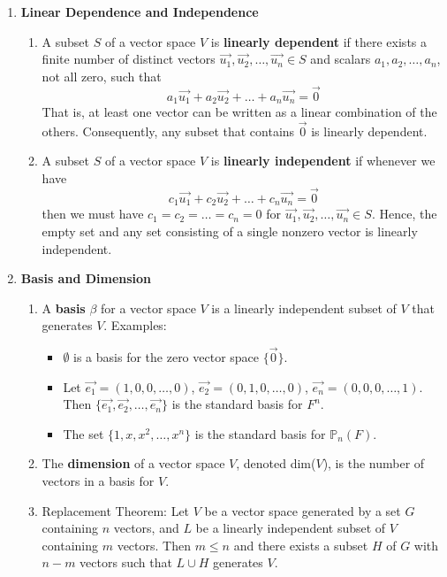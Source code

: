 \documentclass[10pt]{article}
\begin{document}
\begin{multicols*}{2}
\begin{enumerate}
    \item \textbf{Linear Dependence and Independence}
    \begin{enumerate}
        \item A subset $S$ of a vector space $V$ is \textbf{linearly dependent} if there exists a finite number of distinct vectors $\vec{u_1}, \vec{u_2}, \hdots, \vec{u_n} \in S$ and scalars $a_1, a_2, \hdots, a_n$, not all zero, such that
        $$a_1\vec{u_1} + a_2\vec{u_2} + \hdots + a_n\vec{u_n} = \vec{0}$$
        That is, at least one vector can be written as a linear combination of the others. Consequently, any subset that contains $\vec{0}$ is linearly dependent.
        \item A subset $S$ of a vector space $V$ is \textbf{linearly independent} if whenever we have
        $$c_1\vec{u_1} + c_2\vec{u_2} + \hdots + c_n\vec{u_n} = \vec{0}$$ 
        then we must have $c_1 = c_2 = \hdots = c_n = 0$ for $\vec{u_1}, \vec{u_2}, \hdots, \vec{u_n} \in S$. Hence, the empty set and any set consisting of a single nonzero vector is linearly independent.
    \end{enumerate}
    
    \item \textbf{Basis and Dimension}
    \begin{enumerate}
        \item A \textbf{basis} $\beta$ for a vector space $V$ is a linearly independent subset of $V$ that generates $V$. Examples:
        \begin{itemize}
            \item $\emptyset$ is a basis for the zero vector space $\{ \vec{0} \}$.
            \item Let $\vec{e_1} = (1,0,0,\hdots,0)$, $\vec{e_2} = (0,1,0,\hdots,0)$, $\vec{e_n} = (0,0,0,\hdots,1)$. Then $\{ \vec{e_1}, \vec{e_2}, \hdots, \vec{e_n} \}$ is the standard basis for $F^n$.
            \item The set $\{1,x,x^2,\hdots,x^n \}$ is the standard basis for $\mathbb{P}_n(F)$.
        \end{itemize}
        
        \item The \textbf{dimension} of a vector space $V$, denoted dim($V$), is the number of vectors in a basis for $V$.
        
        \item Replacement Theorem: Let $V$ be a vector space generated by a set $G$ containing $n$ vectors, and $L$ be a linearly independent subset of $V$ containing $m$ vectors. Then $m \leq n$ and there exists a subset $H$ of $G$ with $n-m$ vectors such that $L \cup H$ generates $V$.
        

\end{enumerate}
\end{enumerate}
\end{multicols*}
\end{document}
